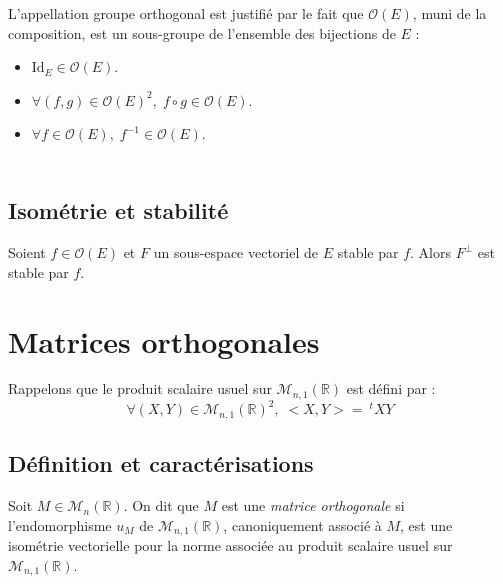 \documentclass[a4paper,10pt]{report}
\begin{document}
\noindent L'appellation groupe orthogonal est justifié par le fait que $\mathcal{O}(E)$, muni de la composition, est un sous-groupe de l'ensemble des bijections de $E$ :

\begin{prop} 
\begin{itemize}
\item $\textrm{Id}_E \in \mathcal{O}(E)$.
\item $\forall (f,g) \in \mathcal{O}(E)^2, \; f \circ g \in \mathcal{O}(E)$.
\item $\forall f \in \mathcal{O}(E), \; f^{-1} \in \mathcal{O}(E)$.
\end{itemize}
\end{prop}

\begin{preuve}
\vspace{5cm}
\end{preuve}

\newpage

$\phantom{test}$

\vspace{2.5cm}

\subsection{Isométrie et stabilité}

\begin{prop} Soient $f \in \mathcal{O}(E)$ et $F$ un sous-espace vectoriel de $E$ stable par $f$. Alors $F^{\perp}$ est stable par $f$.
\end{prop}

\begin{preuve}

\vspace{5cm}
\end{preuve}


\section{Matrices orthogonales}

\noindent Rappelons que le produit scalaire usuel sur $\mathcal{M}_{n,1}(\mathbb{R})$ est défini par :
$$ \forall (X,Y) \in \mathcal{M}_{n,1}(\mathbb{R})^2, \; <X,Y> = ~^tX Y$$
\subsection{Définition et caractérisations}

\begin{defin} Soit $M \in \mathcal{M}_n(\mathbb{R})$. On dit que $M$ est une \textit{matrice orthogonale} si l'endomorphisme $u_M$ de $\mathcal{M}_{n,1}(\mathbb{R})$, canoniquement associé à $M$, est une isométrie vectorielle pour la norme associée au produit scalaire usuel sur $\mathcal{M}_{n,1}(\mathbb{R})$.
\end{defin}
\end{document}
